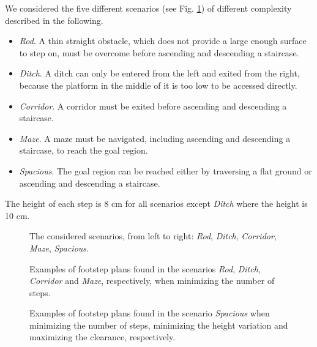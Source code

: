We considered the five different scenarios (see Fig. \ref{fig:Scenarios}) of different complexity described in the following.
\begin{itemize}
    \item \textit{Rod}. A thin straight obstacle, which does not provide a large enough surface to step on, must be overcome before ascending and descending a staircase. 
    \item \textit{Ditch}. A ditch can only be entered from the left and exited from the right, because the platform in the middle of it is too low to be accessed directly.
    \item \textit{Corridor}. A corridor must be exited before ascending and descending a staircase. 
    \item \textit{Maze}. A maze must be navigated, including ascending and descending a staircase, to reach the goal region.
    \item \textit{Spacious}. The goal region can be reached either by traversing a flat ground or ascending and descending a staircase.
\end{itemize}

The height of each step is 8 cm for all scenarios except \textit{Ditch} where the height is 10 cm. 

\begin{figure}
\PlanningScenarios
\caption{The considered scenarios, from left to right: \textit{Rod}, \textit{Ditch}, \textit{Corridor}, \textit{Maze}, \textit{Spacious}.}
\label{fig:Scenarios}
\end{figure}


\begin{figure}
\ExampleResults
\caption{Examples of footstep plans found in the scenarios \textit{Rod}, \textit{Ditch}, \textit{Corridor} and \textit{Maze}, respectively, when minimizing the number of steps.}
\label{fig:ExampleResults}
\end{figure}
\begin{figure}
\ExampleResultsCompare
\caption{Examples of footstep plans found in the scenario \textit{Spacious} when minimizing the number of steps, minimizing the height variation and maximizing the clearance, respectively.}
\label{fig:ExampleResultsCompare}
\end{figure}

